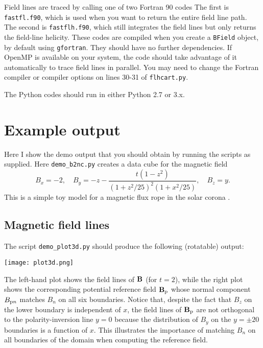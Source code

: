 \documentclass[11pt]{article}
\begin{document}
Field lines are traced by calling one of two Fortran 90 codes The first is \texttt{fastfl.f90}, which is used when you want to return the entire field line path. The second is \texttt{fastflh.f90}, which still integrates the field lines but only returns the field-line helicity. These codes are compiled when you create a \texttt{BField} object, by default using \texttt{gfortran}. They should have no further dependencies. If OpenMP is available on your system, the code should take advantage of it automatically to trace field lines in parallel. You may need to change the Fortran compiler or compiler options on lines 30-31 of \texttt{flhcart.py}.

The Python codes should run in either Python 2.7 or 3.x.

\section{Example output}

Here I show the demo output that you should obtain by running the scripts as supplied. Here \texttt{demo\_b2nc.py} creates a data cube for the magnetic field
\begin{equation}
B_x = -2, \quad B_y = -z - \frac{t(1-z^2)}{(1+z^2/25)^2(1+x^2/25)}, \quad B_z = y.
\end{equation}
This is a simple toy model for a magnetic flux rope in the solar corona \citep{2005ApJ...631.1227H}.

\subsection{Magnetic field lines}

The script \texttt{demo\_plot3d.py} should produce the following (rotatable) output:
\begin{center}
\texttt{[image: plot3d.png]}
\end{center}
The left-hand plot shows the field lines of ${\bf B}$ (for $t=2$), while the right plot shows the corresponding potential reference field ${\bf B}_{\rm p}$ whose normal component $B_{{\rm p}n}$ matches $B_n$ on all six boundaries. Notice that, despite the fact that $B_z$ on the lower boundary is independent of $x$, the field lines of ${\bf B}_{\rm p}$ are not orthogonal to the polarity-inversion line $y=0$ because the distribution of $B_y$ on the $y=\pm 20$ boundaries is a function of $x$. This illustrates the importance of matching $B_n$ on all boundaries of the domain when computing the reference field.
\end{document}
